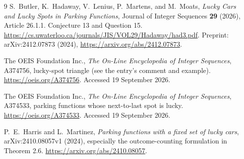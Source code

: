 \documentclass[11pt,letterpaper]{article}
\numberwithin{equation}{section}
\theoremstyle{definition}
\begin{document}
\begin{thebibliography}{9}
S.~Butler, K.~Hadaway, V.~Lenius, P.~Martens, and M.~Moats,
\emph{Lucky Cars and Lucky Spots in Parking Functions},
Journal of Integer Sequences \textbf{29} (2026), Article 26.1.1.
Conjecture 13 and Question 15.
\url{https://cs.uwaterloo.ca/journals/JIS/VOL29/Hadaway/had3.pdf}.
Preprint: arXiv:2412.07873 (2024),
\url{https://arxiv.org/abs/2412.07873}.

The OEIS Foundation Inc., \emph{The On-Line Encyclopedia of Integer Sequences},
A374756, lucky-spot triangle (see the entry's comment and example).
\url{https://oeis.org/A374756}. Accessed 19 September 2026.

The OEIS Foundation Inc., \emph{The On-Line Encyclopedia of Integer Sequences},
A374533, parking functions whose next-to-last spot is lucky.
\url{https://oeis.org/A374533}. Accessed 19 September 2026.

P.~E.~Harris and L.~Martinez,
\emph{Parking functions with a fixed set of lucky cars},
arXiv:2410.08057v1 (2024), especially the outcome-counting formulation
in Theorem 2.6.
\url{https://arxiv.org/abs/2410.08057}.
\end{thebibliography}
\end{document}
